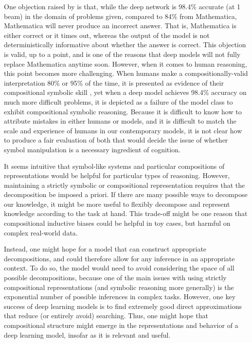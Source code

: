 One objection raised by \citet{Davis2019} is that, while the deep network is 98.4\% accurate (at 1 beam) in the domain of problems given, compared to 84\% from Mathematica, Mathematica will never produce an incorrect answer. That is, Mathematica is either correct or it times out, whereas the output of the model is not deterministically informative about whether the answer is correct. This objection is valid, up to a point, and is one of the reasons that deep models will not fully replace Mathematica anytime soon. However, when it comes to human reasoning, this point becomes more challenging. When humans make a compositionally-valid interpretation 80\% or 95\% of the time, it is presented as evidence of their compositional symbolic skill \citep{Lake2019a}, yet when a deep model achieves 98.4\% accuracy on much more difficult problems, it is depicted as a failure of the model class to exhibit compositional symbolic reasoning. Because it is difficult to know how to attribute mistakes in either humans or models, and it is difficult to match the scale and experience of humans in our contemporary models, it is not clear how to produce a fair evaluation of both that would decide the issue of whether symbol manipulation is a necessary ingredient of cognition. \par 
It seems intuitive that symbol-like systems and particular compositions of representations would be helpful for particular types of reasoning. However, maintaining a strictly symbolic or compositional representation requires that the decomposition be imposed a priori. If there are many possible ways to decompose our knowledge, it might be more useful to flexibly decompose and represent knowledge according to the task at hand. This trade-off might be one reason that compositional inductive biases could be helpful in toy cases, but harmful on complex real-world data.\par
Instead, one might hope for a model that can construct appropriate decompositions, and could therefore allow for any inference in an appropriate context. To do so, the model would need to avoid considering the space of all possible decompositions, because one of the main issues with using strictly compositional representations (and symbolic reasoning more generally) is the exponential number of possible inferences in complex tasks. However, one key success of deep learning models is to find extremely good direct approximations that reduce (or entirely avoid) searching. Thus, one might hope that compositional structure might emerge in the representations and behavior of a deep learning model, insofar as it is relevant and useful.\par 

